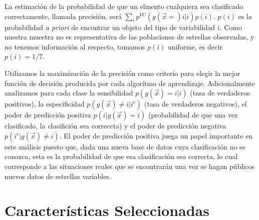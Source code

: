 \documentclass[letterpaper,12pt]{book}
\begin{document}
La estimación de la probabilidad de que un elmento cualquiera sea clasificado correctamente, llamada precisión,  será $\sum_{i}p^{VC}(g(\vec{x}=)i|i)p(i)$. $p(i)$ es la probabilidad \textit{a priori} de encontrar un objeto del tipo de variabilidad $i$. Como nuestra muestra no es representativa de las poblaciones de estrellas observadas, y no tenemos información al respecto, tomamos $p(i)$ uniforme, es decir $p(i) = 1/7$.

Utilizamos la maximización de la precisión como criterio para elegir la mejor función de decisión producida por cada algorítmo de aprendizaje. Adicionalmente analizamos para cada clase la sensibilidad $p(g(\vec{x})=i|i)$ (tasa de verdaderos positivos),  la especificidad $p(g(\vec{x})\neq i|i^c)$ (tasa de verdaderos negativos), el poder de predicción positiva $p(i|g(\vec{x})=i)$ (probabilidad de que una vez clasificado, la clasifición sea correccta) y el poder de predicción negativa $p(i^c|g(\vec{x})\neq i)$. El poder de predicción positiva juega un papel importante en este análisis puesto que, dada una nueva base de datos cuya clasificación no se conozca, esta es la probabilidad de que esa clasificación sea correcta, lo cual corresponde a las situaciones reales que se encontrarán una vez se hagan públicos nuevos datos de estrellas variables. 




\section{Características Seleccionadas \label{sec:atributos}}
\end{document}
